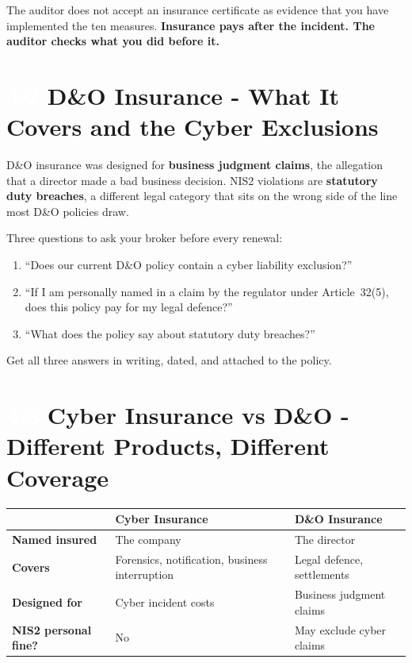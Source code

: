 \documentclass[11pt,a4paper,twoside]{book}
\newcommand{\lessontag}[1]{%
  \texorpdfstring{%
    \setlength{\fboxsep}{3pt}\colorbox{nisd2blue}{\textcolor{white}{\footnotesize\bfseries #1}}\quad%
  }{Lesson #1\ }%
}
\begin{document}
The auditor does not accept an insurance certificate as evidence that you have implemented the ten measures. \textbf{Insurance pays after the incident. The auditor checks what you did before it.}

\section{\lessontag{4.2}D\&O Insurance - What It Covers and the Cyber Exclusions}

D\&O insurance was designed for \textbf{business judgment claims}, the allegation that a director made a bad business decision. NIS2 violations are \textbf{statutory duty breaches}, a different legal category that sits on the wrong side of the line most D\&O policies draw.

\begin{actionbox}
Three questions to ask your broker before every renewal:
\begin{enumerate}
  \item ``Does our current D\&O policy contain a cyber liability exclusion?''
  \item ``If I am personally named in a claim by the regulator under Article~32(5), does this policy pay for my legal defence?''
  \item ``What does the policy say about statutory duty breaches?''
\end{enumerate}
Get all three answers in writing, dated, and attached to the policy.
\end{actionbox}

\section{\lessontag{4.3}Cyber Insurance vs D\&O - Different Products, Different Coverage}

\begin{center}
\begin{tabular}{@{}lll@{}}
\toprule
\textbf{} & \textbf{Cyber Insurance} & \textbf{D\&O Insurance} \\
\midrule
\textbf{Named insured} & The company & The director \\
\textbf{Covers} & Forensics, notification, business interruption & Legal defence, settlements \\
\textbf{Designed for} & Cyber incident costs & Business judgment claims \\
\textbf{NIS2 personal fine?} & No & May exclude cyber claims \\
\bottomrule
\end{tabular}
\end{center}
\end{document}
